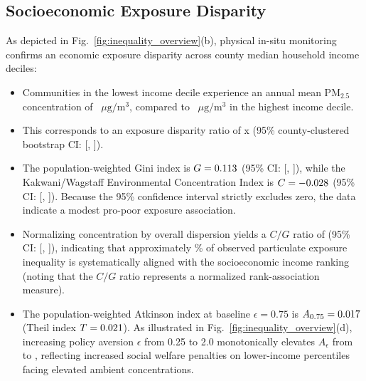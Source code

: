 \documentclass[conference]{IEEEtran}
\begin{document}
\subsection{Socioeconomic Exposure Disparity}
As depicted in Fig.~\ref{fig:inequality_overview}(b), physical in-situ monitoring confirms an economic exposure disparity across county median household income deciles:
\begin{itemize}
    \item Communities in the lowest income decile experience an annual mean $\mathrm{PM}_{2.5}$ concentration of \lowestIncomePm{}~$\mu\mathrm{g}/\mathrm{m}^3$, compared to \highestIncomePm{}~$\mu\mathrm{g}/\mathrm{m}^3$ in the highest income decile.
    \item This corresponds to an exposure disparity ratio of \disparityRatio{}x (95\% county-clustered bootstrap CI: [\disparityRatioCiLow{}, \disparityRatioCiHigh{}]).
    \item The population-weighted Gini index is $G = 0.113{}$ (95\% CI: [\giniCiLow{}, \giniCiHigh{}]), while the Kakwani/Wagstaff Environmental Concentration Index is $C = -0.028{}$ (95\% CI: [\concCiLow{}, \concCiHigh{}]). Because the 95\% confidence interval strictly excludes zero, the data indicate a modest pro-poor exposure association.
    \item Normalizing concentration by overall dispersion yields a $C/G$ ratio of \cgRatio{} (95\% CI: [\cgRatioCiLow{}, \cgRatioCiHigh{}]), indicating that approximately \cgPct{}\% of observed particulate exposure inequality is systematically aligned with the socioeconomic income ranking (noting that the $C/G$ ratio represents a normalized rank-association measure).
    \item The population-weighted Atkinson index at baseline $\epsilon = 0.75$ is $A_{0.75} = 0.017{}$ (Theil index $T = 0.021{}$). As illustrated in Fig.~\ref{fig:inequality_overview}(d), increasing policy aversion $\epsilon$ from 0.25 to 2.0 monotonically elevates $A_\epsilon$ from \atkinsonLowEps{} to \atkinsonHighEps{}, reflecting increased social welfare penalties on lower-income percentiles facing elevated ambient concentrations.
\end{itemize}
\end{document}
